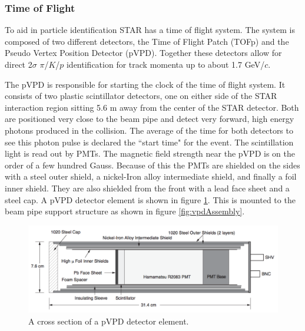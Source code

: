 \documentclass[abstract = on,listof=totoc, bibliography=totoc]{scrreprt}
\begin{document}
\FloatBarrier

\subsubsection[TOF]{Time of Flight}

To aid in particle identification STAR has a time of flight system. The system is composed of two different detectors, the Time of Flight Patch (TOFp) and the Pseudo Vertex Position Detector (pVPD).  Together these detectors allow for direct 2$\sigma$ $\pi$/$K$/$p$ identification for track momenta up to about 1.7 GeV/$c$.

The pVPD is responsible for starting the clock of the time of flight system. It consists of two plastic scintillator detectors, one on either side of the STAR interaction region sitting 5.6 m away from the center of the STAR detector. Both are positioned very close to the beam pipe and detect very forward, high energy photons produced in the collision. The average of the time for both detectors to see this photon pulse is declared the ``start time" for the event. The scintillation light is read out by PMTs. The magnetic field strength near the pVPD is on the order of a few hundred Gauss. Because of this the PMTs are shielded on the sides with a steel outer shield, a nickel-Iron alloy intermediate shield, and finally a foil inner shield. They are also shielded from the front with a lead face sheet and a steel cap. A pVPD detector element is shown in figure \ref{fig:vpdDetector}. This is mounted to the beam pipe support structure as shown in figure \ref{fig:vpdAssembly}.    

\begin{figure}
\begin{center}
\includegraphics[width = .8\textwidth]{vpdDetector}
\caption[pVPD detector element]{A cross section of a pVPD detector element.}
\label{fig:vpdDetector}
\end{center}
\end{figure}
\end{document}
